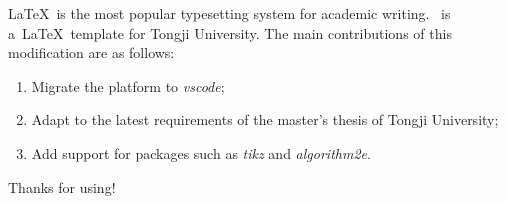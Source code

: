 
\begin{eabstract}
  \LaTeX~is the most popular typesetting system for academic writing.
  \tongjithesis{}~is a~\LaTeX~template for Tongji University. The main contributions of this modification are as follows:

  \begin{enumerate}[1.]
    \item Migrate the platform to \emph{vscode};
    \item Adapt to the latest requirements of the master's thesis of Tongji University;
    \item Add support for packages such as \emph{tikz} and \emph{algorithm2e}.
  \end{enumerate}

  Thanks for using!
\end{eabstract}

